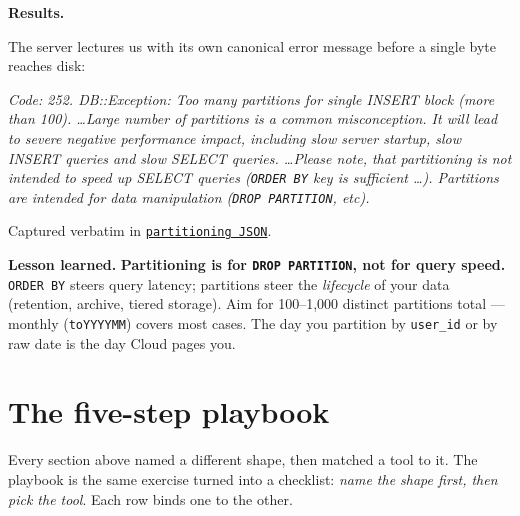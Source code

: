 \documentclass[11pt]{article}
\newcommand{\resultsHd}{%
  \par\smallskip\noindent\textbf{\color{accentblue}Results.}\par\nopagebreak\smallskip}
\newcommand{\lesson}[1]{%
  \par\medskip
  \begin{lessonbox}\textbf{\color{accentgreen}Lesson learned.}\enspace #1\end{lessonbox}}
\begin{document}
\resultsHd
The server lectures us with its own canonical error message before a
single byte reaches disk:

\begin{tcolorbox}[colback=accentred!8, colframe=accentred,
                  boxrule=0pt, leftrule=3pt, arc=2pt,
                  left=10pt, right=10pt, top=4pt, bottom=4pt,
                  enhanced jigsaw, fontupper=\small]
\textit{Code: 252. DB::Exception: Too many partitions for single INSERT
block (more than 100). \ldots Large number of partitions is a common
misconception. It will lead to severe negative performance impact,
including slow server startup, slow INSERT queries and slow SELECT
queries. \ldots Please note, that partitioning is not intended to speed
up SELECT queries (\texttt{ORDER BY} key is sufficient \ldots).
Partitions are intended for data manipulation
(\texttt{DROP PARTITION}, etc).}
\end{tcolorbox}

\smallskip
Captured verbatim in
\href{run:results/compare_features_20260503_191740.json}{\texttt{partitioning JSON}}.

\lesson{%
\textbf{Partitioning is for \texttt{DROP PARTITION}, not for query
speed.} \texttt{ORDER BY} steers query latency; partitions steer the
\emph{lifecycle} of your data (retention, archive, tiered storage).
Aim for 100--1{,}000 distinct partitions total --- monthly
(\texttt{toYYYYMM}) covers most cases. The day you partition by
\texttt{user\_id} or by raw date is the day Cloud pages you.}

\section*{The five-step playbook}

Every section above named a different shape, then matched a tool to
it. The playbook is the same exercise turned into a checklist:
\emph{name the shape first, then pick the tool}. Each row binds one
to the other.
\end{document}
